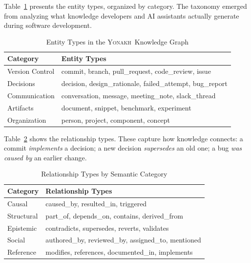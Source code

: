 \documentclass[10pt,journal,compsoc]{IEEEtran}
\newcommand{\yonakh}{\textsc{Yonakh}}
\begin{document}
Table~\ref{tab:entities} presents the entity types, organized by category. The taxonomy emerged from analyzing what knowledge developers and AI assistants actually generate during software development.

\begin{table}[t]
\caption{Entity Types in the \yonakh\ Knowledge Graph}
\label{tab:entities}
\centering
\small
\renewcommand{\arraystretch}{1.3}
\begin{tabular}{@{}p{} p{}@{}}
\toprule
\textbf{Category} & \textbf{Entity Types} \\
\midrule
Version Control & commit, branch, pull\_request, code\_review, issue \\
Decisions & decision, design\_rationale, failed\_attempt, bug\_report \\
Communication & conversation, message, meeting\_note, slack\_thread \\
Artifacts & document, snippet, benchmark, experiment \\
Organization & person, project, component, concept \\
\bottomrule
\end{tabular}
\end{table}

Table~\ref{tab:relationships} shows the relationship types. These capture how knowledge connects: a commit \emph{implements} a decision; a new decision \emph{supersedes} an old one; a bug \emph{was caused by} an earlier change.

\begin{table}[t]
\caption{Relationship Types by Semantic Category}
\label{tab:relationships}
\centering
\small
\renewcommand{\arraystretch}{1.3}
\begin{tabular}{@{}p{} p{}@{}}
\toprule
\textbf{Category} & \textbf{Relationship Types} \\
\midrule
Causal & caused\_by, resulted\_in, triggered \\
Structural & part\_of, depends\_on, contains, derived\_from \\
Epistemic & contradicts, supersedes, reverts, validates \\
Social & authored\_by, reviewed\_by, assigned\_to, mentioned \\
Reference & modifies, references, documented\_in, implements \\
\bottomrule
\end{tabular}
\end{table}
\end{document}
